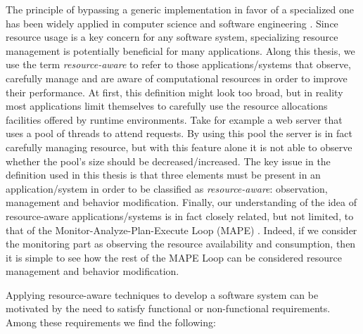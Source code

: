 The principle of bypassing a generic implementation in favor of a specialized one has been widely applied in computer science and software engineering \cite{engler1995exokernel, Munro1996,Dragos:2009:CGT:1565824.1565830, muller,Marinos:2014:NSS:2619239.2626311}.
Since resource usage is a key concern for any software system, specializing resource management is potentially beneficial for many applications.
Along this thesis, we use the term \textit{resource-aware} to refer to those applications/systems that observe, carefully manage and are aware of computational resources in order to improve their performance. 
At first, this definition might look too broad, but in reality most applications limit themselves to carefully use the resource allocations facilities offered by runtime environments.
Take for example a web server that uses a pool of threads to attend requests.
By using this pool the server is in fact carefully managing resource, but with this feature alone it is not able to observe whether the pool's size should be decreased/increased.
The key issue in the definition used in this thesis is that three elements must be present in an application/system in order to be classified as \textit{resource-aware}: observation, management and behavior modification. 
Finally, our understanding of the idea of resource-aware applications/systems is in fact closely related, but not limited,  to that of the Monitor-Analyze-Plan-Execute Loop (MAPE) \cite{Brun:2009:ESS:1573856.1573860}.
Indeed, if we consider the monitoring part as observing the resource availability and consumption, then it is simple to see how the rest of the MAPE Loop can be considered resource management and behavior modification.

Applying resource-aware techniques to develop a software system can be motivated by the need to satisfy functional or non-functional requirements.
Among these requirements we find the following:

